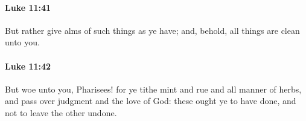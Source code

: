 		\paragraph{Luke 11:41} %
			\label{LUKE-11-41}

			But rather give alms of such things as ye have; and, behold, all things are clean unto you.

			\begin{framed}
			\scriptsize
				\begin{compactdesc}
					\item[SBLG] 
				\end{compactdesc}
			\end{framed}

		\paragraph{Luke 11:42} %
			\label{LUKE-11-42}

			But woe unto you, Pharisees! for ye tithe mint and rue and all manner of herbs, and pass over judgment and the love of God: these ought ye to have done, and not to leave the other undone.

